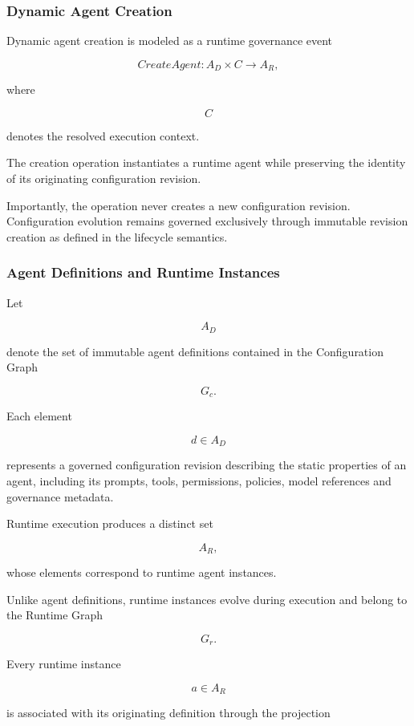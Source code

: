 \documentclass[10pt]{article}
\begin{document}
\subsubsection{Dynamic Agent Creation}

Dynamic agent creation is modeled as a runtime governance event

\begin{equation}
CreateAgent
:
A_D
\times
C
\rightarrow
A_R,
\label{eq:dynamic_agent1}
\end{equation}


where

\[
C
\]

denotes the resolved execution context.

The creation operation instantiates a runtime agent while preserving the
identity of its originating configuration revision.

Importantly, the operation never creates a new configuration revision.
Configuration evolution remains governed exclusively through immutable revision
creation as defined in the lifecycle semantics.
\subsubsection{Agent Definitions and Runtime Instances}

Let

\[
A_D
\]

denote the set of immutable agent definitions contained in the Configuration
Graph

\[
G_c.
\]

Each element

\[
d\in A_D
\]

represents a governed configuration revision describing the static properties
of an agent, including its prompts, tools, permissions, policies, model
references and governance metadata.

Runtime execution produces a distinct set

\[
A_R,
\]

whose elements correspond to runtime agent instances.

Unlike agent definitions, runtime instances evolve during execution and belong
to the Runtime Graph

\[
G_r.
\]

Every runtime instance

\[
a\in A_R
\]

is associated with its originating definition through the projection
\end{document}
